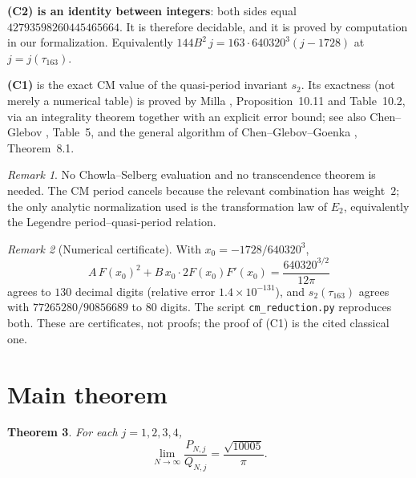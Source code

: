 \documentclass[11pt]{article}
\newtheorem{theorem}{Theorem}
\theoremstyle{remark}
\newtheorem{remark}[theorem]{Remark}
\begin{document}
\noindent
\textbf{(C2) is an identity between integers}: both sides equal
$42793598260445465664$.  It is therefore decidable, and it is proved
by computation in our formalization.  Equivalently
$144B^2\,j=163\cdot 640320^3(j-1728)$ at $j=j(\tau_{163})$.

\medskip
\noindent
\textbf{(C1)} is the exact CM value of the quasi-period invariant
$s_2$.  Its exactness (not merely a numerical table) is proved by
Milla \cite{Milla2018}, Proposition~10.11 and Table~10.2, via an
integrality theorem together with an explicit error bound; see also
Chen--Glebov \cite{ChenGlebov}, Table~5, and the general algorithm of
Chen--Glebov--Goenka \cite{CGG}, Theorem~8.1.

\begin{remark}
No Chowla--Selberg evaluation and no transcendence theorem is needed.
The CM period cancels because the relevant combination has weight~$2$;
the only analytic normalization used is the transformation law of
$E_2$, equivalently the Legendre period--quasi-period relation.
\end{remark}

\begin{remark}[Numerical certificate]
With $x_0=-1728/640320^3$,
\[
A\,F(x_0)^2+B\,x_0\cdot 2F(x_0)F'(x_0)
=\frac{640320^{3/2}}{12\pi}
\]
agrees to $130$ decimal digits (relative error $1.4\times10^{-131}$),
and $s_2(\tau_{163})$ agrees with $77265280/90856689$ to $80$ digits.
The script \texttt{cm\_reduction.py} reproduces both.  These are
certificates, not proofs; the proof of (C1) is the cited classical
one.
\end{remark}

\section{Main theorem}

\begin{theorem}
For each $j = 1, 2, 3, 4$,
\[
\lim_{N \to \infty} \frac{P_{N,j}}{Q_{N,j}}
= \frac{\sqrt{10005}}{\pi}.
\]
\end{theorem}
\end{document}
